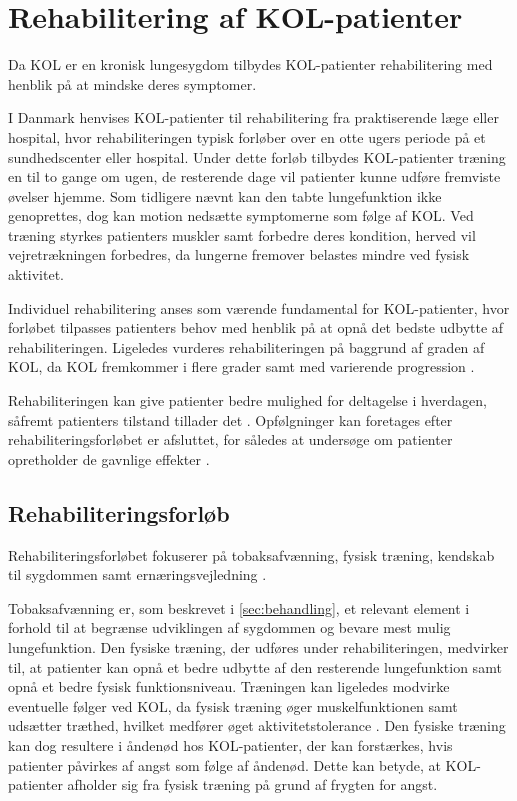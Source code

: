 \section{Rehabilitering af KOL-patienter}
Da KOL er en kronisk lungesygdom tilbydes KOL-patienter rehabilitering med henblik på at mindske deres symptomer. 

I Danmark henvises KOL-patienter til rehabilitering fra praktiserende læge eller hospital, hvor rehabiliteringen typisk forløber over en otte ugers periode på et sundhedscenter eller hospital. Under dette forløb tilbydes KOL-patienter træning en til to gange om ugen, de resterende dage vil patienter kunne udføre fremviste øvelser hjemme.\cite{McCarthy2015,Frausing2011b} Som tidligere nævnt kan den tabte lungefunktion ikke genoprettes, dog kan motion nedsætte symptomerne som følge af KOL. Ved træning styrkes patienters muskler samt forbedre deres kondition, herved vil vejretrækningen forbedres, da lungerne fremover belastes mindre ved fysisk aktivitet.\cite{Lungeforeningen2016}

Individuel rehabilitering anses som værende fundamental for KOL-patienter, hvor forløbet tilpasses patienters behov med henblik på at opnå det bedste udbytte af rehabiliteringen.\cite{McCarthy2015,Habraken2011,Sundhedsstyrelsen2015} Ligeledes vurderes rehabiliteringen på baggrund af graden af KOL, da KOL fremkommer i flere grader samt med varierende progression \cite{McCarthy2015}.

Rehabiliteringen kan give patienter bedre mulighed for deltagelse i hverdagen, såfremt patienters tilstand tillader det \cite{McCarthy2015,Habraken2011, Sundhedsstyrelsen2015}. Opfølgninger kan foretages efter rehabiliteringsforløbet er afsluttet, for således at undersøge om patienter opretholder de gavnlige effekter \cite{Frausing2011b}.


\subsection{Rehabiliteringsforløb}
Rehabiliteringsforløbet fokuserer på tobaksafvænning, fysisk træning, kendskab til sygdommen samt ernæringsvejledning \cite{McCarthy2015,Habraken2011,Sundhedsstyrelsen2015}.

Tobaksafvænning er, som beskrevet i \autoref{sec:behandling}, et relevant element i forhold til at begrænse udviklingen af sygdommen og bevare mest mulig lungefunktion. Den fysiske træning, der udføres under rehabiliteringen, medvirker til, at patienter kan opnå et bedre udbytte af den resterende lungefunktion samt opnå et bedre fysisk funktionsniveau.\cite{Sundhedsstyrelsen2015}
Træningen kan ligeledes modvirke eventuelle følger ved KOL, da fysisk træning øger muskelfunktionen samt udsætter træthed, hvilket medfører øget aktivitetstolerance \cite{McCarthy2015}. Den fysiske træning kan dog resultere i åndenød hos KOL-patienter, der kan forstærkes, hvis patienter påvirkes af angst som følge af åndenød. Dette kan betyde, at KOL-patienter afholder sig fra fysisk træning på grund af frygten for angst.\cite{McCarthy2015, Sundhedsstyrelsen2015} 

